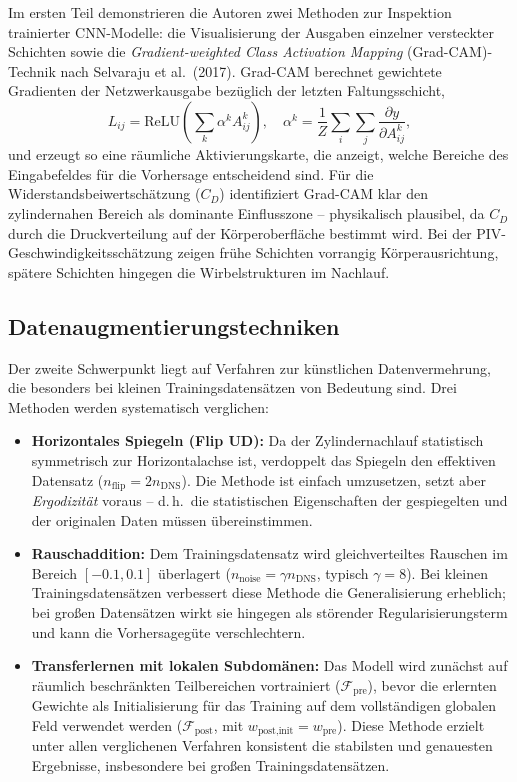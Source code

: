 \documentclass[a4paper,12pt]{article}
\begin{document}
Im ersten Teil demonstrieren die Autoren zwei Methoden zur Inspektion trainierter CNN-Modelle: die Visualisierung der Ausgaben einzelner versteckter Schichten sowie die \textit{Gradient-weighted Class Activation Mapping} (Grad-CAM)-Technik nach Selvaraju et al.\ (2017). Grad-CAM berechnet gewichtete Gradienten der Netzwerkausgabe bezüglich der letzten Faltungsschicht,
\begin{equation}
    L_{ij} = \mathrm{ReLU}\!\left(\sum_k \alpha^k A^k_{ij}\right), \quad \alpha^k = \frac{1}{Z}\sum_i\sum_j \frac{\partial y}{\partial A^k_{ij}},
\end{equation}
und erzeugt so eine räumliche Aktivierungskarte, die anzeigt, welche Bereiche des Eingabefeldes für die Vorhersage entscheidend sind. Für die Widerstandsbeiwertschätzung ($C_D$) identifiziert Grad-CAM klar den zylindernahen Bereich als dominante Einflusszone -- physikalisch plausibel, da $C_D$ durch die Druckverteilung auf der Körperoberfläche bestimmt wird. Bei der PIV-Geschwindigkeitsschätzung zeigen frühe Schichten vorrangig Körperausrichtung, spätere Schichten hingegen die Wirbelstrukturen im Nachlauf.

\subsection*{Datenaugmentierungstechniken}

Der zweite Schwerpunkt liegt auf Verfahren zur künstlichen Datenvermehrung, die besonders bei kleinen Trainingsdatensätzen von Bedeutung sind. Drei Methoden werden systematisch verglichen:

\begin{itemize}
    \item \textbf{Horizontales Spiegeln (Flip UD):} Da der Zylindernachlauf statistisch symmetrisch zur Horizontalachse ist, verdoppelt das Spiegeln den effektiven Datensatz ($n_\text{flip} = 2 n_\text{DNS}$). Die Methode ist einfach umzusetzen, setzt aber \textit{Ergodizität} voraus -- d.\,h.\ die statistischen Eigenschaften der gespiegelten und der originalen Daten müssen übereinstimmen.
    
    \item \textbf{Rauschaddition:} Dem Trainingsdatensatz wird gleichverteiltes Rauschen im Bereich $[-0.1, 0.1]$ überlagert ($n_\text{noise} = \gamma n_\text{DNS}$, typisch $\gamma = 8$). Bei kleinen Trainingsdatensätzen verbessert diese Methode die Generalisierung erheblich; bei großen Datensätzen wirkt sie hingegen als störender Regularisierungsterm und kann die Vorhersagegüte verschlechtern.
    
    \item \textbf{Transferlernen mit lokalen Subdomänen:} Das Modell wird zunächst auf räumlich beschränkten Teilbereichen vortrainiert ($\mathcal{F}_\text{pre}$), bevor die erlernten Gewichte als Initialisierung für das Training auf dem vollständigen globalen Feld verwendet werden ($\mathcal{F}_\text{post}$, mit $w_\text{post,init} = w_\text{pre}$). Diese Methode erzielt unter allen verglichenen Verfahren konsistent die stabilsten und genauesten Ergebnisse, insbesondere bei großen Trainingsdatensätzen.
\end{itemize}
\end{document}
